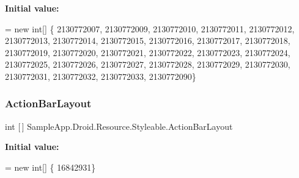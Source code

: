 {\bfseries Initial value\+:}
\begin{DoxyCode}
= \textcolor{keyword}{new} \textcolor{keywordtype}{int}[] \{
                    2130772007,
                    2130772009,
                    2130772010,
                    2130772011,
                    2130772012,
                    2130772013,
                    2130772014,
                    2130772015,
                    2130772016,
                    2130772017,
                    2130772018,
                    2130772019,
                    2130772020,
                    2130772021,
                    2130772022,
                    2130772023,
                    2130772024,
                    2130772025,
                    2130772026,
                    2130772027,
                    2130772028,
                    2130772029,
                    2130772030,
                    2130772031,
                    2130772032,
                    2130772033,
                    2130772090\}
\end{DoxyCode}
\mbox{\label{class_sample_app_1_1_droid_1_1_resource_1_1_styleable_a045150480f79f4ccf56954f24cdaa151}} 
\subsubsection{\texorpdfstring{Action\+Bar\+Layout}{ActionBarLayout}}
{\footnotesize\ttfamily int \mbox{[}$\,$\mbox{]} Sample\+App.\+Droid.\+Resource.\+Styleable.\+Action\+Bar\+Layout\hspace{0.3cm}{\ttfamily [static]}}

{\bfseries Initial value\+:}
\begin{DoxyCode}
= \textcolor{keyword}{new} \textcolor{keywordtype}{int}[] \{
                    16842931\}
\end{DoxyCode}
\mbox{\label{class_sample_app_1_1_droid_1_1_resource_1_1_styleable_ad7e62a18449ec54c73782cf1801da9e4}} 
